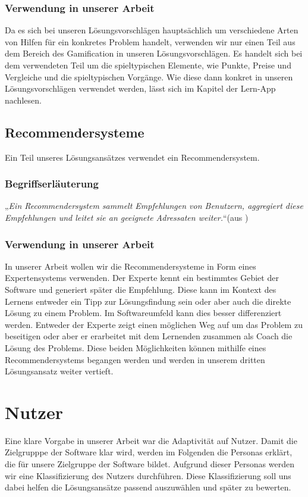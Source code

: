 \subsection{Verwendung in unserer Arbeit}
Da es sich bei unseren Lösungsvorschlägen hauptsächlich um verschiedene Arten von Hilfen für ein konkretes Problem handelt, verwenden wir nur einen Teil aus dem Bereich des Gamification in unseren Lösungsvorschlägen. Es handelt sich bei dem verwendeten Teil um die spieltypischen Elemente, wie Punkte, Preise und Vergleiche und die spieltypischen Vorgänge. Wie diese dann konkret in unseren Lösungsvorschlägen verwendet werden, lässt sich im Kapitel der Lern-App nachlesen.

\section{Recommendersysteme}
Ein Teil unseres Lösungsansätzes verwendet ein Recommendersystem.
\subsection{Begriffserläuterung}
„\textit{Ein Recommendersystem sammelt Empfehlungen von Benutzern, aggregiert diese Empfehlungen und leitet sie an geeignete Adressaten weiter.}“(aus \cite{recommender})

\subsection{Verwendung in unserer Arbeit}
In unserer Arbeit wollen wir die Recommendersysteme in Form eines Expertensystems verwenden.  Der Experte kennt ein bestimmtes Gebiet der Software und generiert später die Empfehlung. Diese kann im Kontext des Lernens entweder ein Tipp zur Lösungsfindung sein oder aber auch die direkte Lösung zu einem Problem. Im Softwareumfeld kann dies besser differenziert werden. Entweder der Experte zeigt einen möglichen  Weg auf um das Problem zu beseitigen oder aber er erarbeitet mit dem Lernenden zusammen als Coach die Lösung des Problems. Diese beiden Möglichkeiten können mithilfe eines Recommendersystems begangen werden und werden in unserem dritten Lösungsansatz weiter vertieft.


\chapter{Nutzer}
Eine klare Vorgabe in unserer Arbeit war die Adaptivität auf Nutzer. Damit die Zielgrupppe der Software klar wird, werden im Folgenden die Personas erklärt, die für unsere Zielgruppe der Software bildet. Aufgrund dieser Personas werden wir eine Klassifizierung des Nutzers durchführen. Diese Klassifizierung soll uns dabei helfen die Lösungsansätze passend auszuwählen und später zu bewerten.


